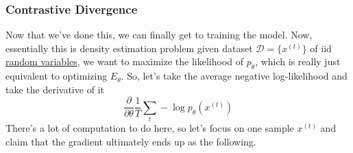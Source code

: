 \documentclass{article}
\begin{document}
  \subsubsection{Contrastive Divergence}

    Now that we've done this, we can finally get to training the model. Now, essentially this is density estimation problem given dataset $\mathcal{D} = \{x^{(t)}\}$ of iid \hyperref[prob-def:random-variable]{random variables}, we want to maximize the likelihood of $p_{\theta}$, which is really just equivalent to optimizing $E_{\theta}$. So, let's take the average negative log-likelihood and take the derivative of it
    \begin{equation}
      \frac{\partial}{\partial \theta} \frac{1}{T} \sum_t - \log p_{\theta} (x^{(t)})
    \end{equation}
    There's a lot of computation to do here, so let's focus on one sample $x^{(t)}$ and claim that the gradient ultimately ends up as the following. 
\end{document}
